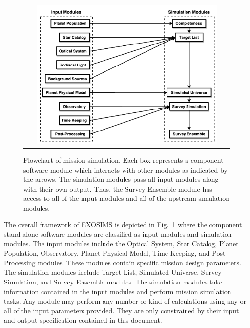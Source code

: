 \documentclass[cleanfoot]{asme2ej}
\begin{document}
\begin{figure}[ht]
    \begin{center}
        \begin{tabular}{c}
             \includegraphics[width=0.9\textwidth]{codeflow5}
        \end{tabular}
    \end{center}
    \caption{Flowchart of mission simulation. Each box represents a component software module which interacts with other modules as indicated by the arrows. The simulation modules pass all input modules along with their own output.  Thus, the Survey Ensemble module has access to all of the input modules and all of the upstream simulation modules.}
    \label{figure_framework}
\end{figure}

The overall framework of EXOSIMS is depicted in Fig.~\ref{figure_framework} where the component stand-alone software modules are classified as input modules and simulation modules.  The input modules include the Optical System, Star Catalog, Planet Population, Observatory, Planet Physical Model, Time Keeping, and Post-Processing modules.  These modules contain specific mission design parameters.  The simulation modules include Target List, Simulated Universe, Survey Simulation, and Survey Ensemble modules.  The simulation modules take information contained in the input modules and perform mission simulation tasks.  Any module may perform any number or kind of calculations using any or all of the input parameters provided.  They are only constrained by their input and output specification contained in this document.
\end{document}
